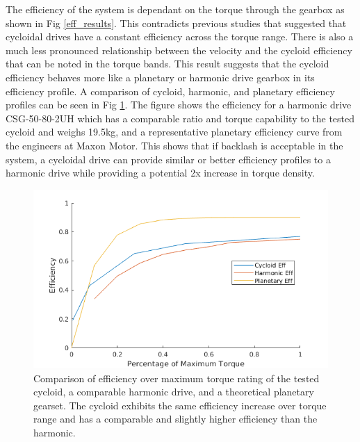
The efficiency of the system is dependant on the torque through the gearbox as shown in Fig \ref{eff_results}. This contradicts previous studies that suggested that cycloidal drives have a constant efficiency across the torque range. There is also a much less pronounced relationship between the velocity and the cycloid efficiency that can be noted in the torque bands. This result suggests that the cycloid efficiency behaves more like a planetary or harmonic drive gearbox in its efficiency profile. A comparison of cycloid, harmonic, and planetary efficiency profiles can be seen in Fig \ref{eff_comp}. The figure shows the efficiency for a harmonic drive CSG-50-80-2UH \cite{harmonic_sheet} which has a comparable ratio and torque capability to the tested cycloid and weighs 19.5kg, and a representative planetary efficiency curve from the engineers at Maxon Motor. This shows that if backlash is acceptable in the system, a cycloidal drive can provide similar or better efficiency profiles to a harmonic drive while providing a potential 2x increase in torque density.

   \begin{figure}[!b]
      \centering
      \includegraphics[width=\linewidth]{eff_comp_v2}
      \caption{Comparison of efficiency over maximum torque rating of the tested cycloid, a comparable harmonic drive, and a theoretical planetary gearset. The cycloid exhibits the same efficiency increase over torque range and has a comparable and slightly higher efficiency than the harmonic.}
      \label{eff_comp}
   \end{figure}
   
